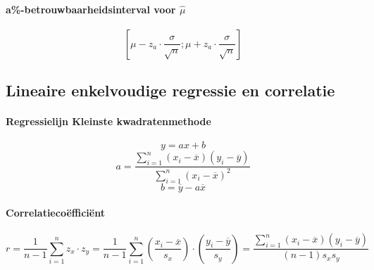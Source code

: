   \paragraph{a\%-betrouwbaarheidsinterval voor $\hat{\mu}$}
  \label{sec:aBetrouwbaarheidsintervalVoorMu}
  \[
    \left[\mu-z_a\cdot\frac{\sigma}{\sqrt{n}};
          \mu+z_a\cdot\frac{\sigma}{\sqrt{n}}\right]
  \]


\subsection{Lineaire enkelvoudige regressie en correlatie}
\label{sec:LineaireEnkelvoudigeRegressieEnCorrelatie}
  \paragraph{Regressielijn Kleinste kwadratenmethode}
  \label{sec:KleinsteKwadratenmethode}
    \[
     y = ax + b
    \]
    \[
     a = \frac{\sum_{i=1}^{n}
               \left(x_i-\overline{x}\right)\left(y_i-\overline{y}\right)
              }{\sum_{i=1}^{n}\left(x_i-\overline{x}\right)^2}
    \]
    \[
     b = \overline{y} - a\overline{x}
    \]


\paragraph{Correlatiecoëfficiënt}
\label{sec:Correlatiecoefficient}
  \[
     r = \frac{1}{n-1}\sum_{i=1}^{n}z_x \cdot z_y
       = \frac{1}{n-1}\sum_{i=1}^{n}\left(\frac{x_i-\overline{x}}{s_x}\right)
                             \cdot \left(\frac{y_i-\overline{y}}{s_y}\right)
       = \frac{\sum_{i=1}^{n}\left(x_i-\overline{x}\right)\left(y_i-\overline{y}\right)}
              {\left(n-1\right)s_x s_y}
    \]
